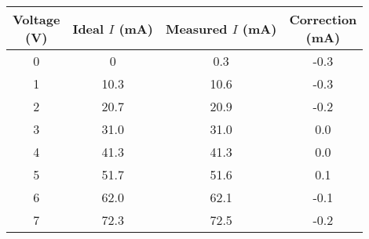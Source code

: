 \begin{tabular}{ | c | c | c | c | } \hline

	\thead{Voltage \\ (V)} & \thead{Ideal $I$ \\ (mA)} & \thead{Measured $I$ \\ (mA)} & \thead{Correction \\ (mA)} \\ \hline
	
	0 & 0    & 0.3  & -0.3  \\ \hline
	1 & 10.3 & 10.6 & -0.3  \\ \hline
	2 & 20.7 & 20.9 & -0.2  \\ \hline
	3 & 31.0 & 31.0 & 0.0   \\ \hline
	4 & 41.3 & 41.3 & 0.0   \\ \hline
	5 & 51.7 & 51.6 & 0.1   \\ \hline
	6 & 62.0 & 62.1 & -0.1  \\ \hline
	7 & 72.3 & 72.5 & -0.2  \\ \hline

\end{tabular}
